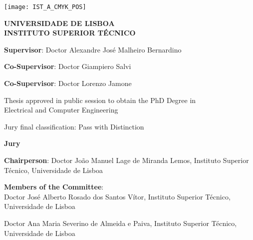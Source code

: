

\begin{titlepage}
\setlength{\parindent}{0pt}
\texttt{[image: IST\_A\_CMYK\_POS]}

\begingroup
\centering

\vspace{0.75cm}

\Large
\textbf{UNIVERSIDADE DE LISBOA\\
INSTITUTO SUPERIOR TÉCNICO}

\myVertSpace

\large

\textbf{\myThesisTitle}

\vspace{0.75cm}

\myFullName

\myVertSpace
\endgroup

\large

\textbf{Supervisor}: Doctor Alexandre José Malheiro Bernardino

\textbf{Co-Supervisor}: Doctor Giampiero Salvi

\textbf{Co-Supervisor}: Doctor Lorenzo Jamone

\myVertSpace

\begingroup
\centering

Thesis approved in public session to obtain the PhD Degree in\\Electrical and Computer Engineering

\vspace{0.75cm}

Jury final classification: Pass with Distinction

\myVertSpace

\textbf{Jury}

\endgroup

\textbf{Chairperson}: Doctor João Manuel Lage de Miranda Lemos, Instituto Superior Técnico, Universidade de Lisboa

\textbf{Members of the Committee}:\\
Doctor José Alberto Rosado dos Santos Vítor, Instituto Superior Técnico,\\ Universidade de Lisboa

Doctor Ana Maria Severino de Almeida e Paiva, Instituto Superior Técnico,\\ Universidade de Lisboa


\end{titlepage}
